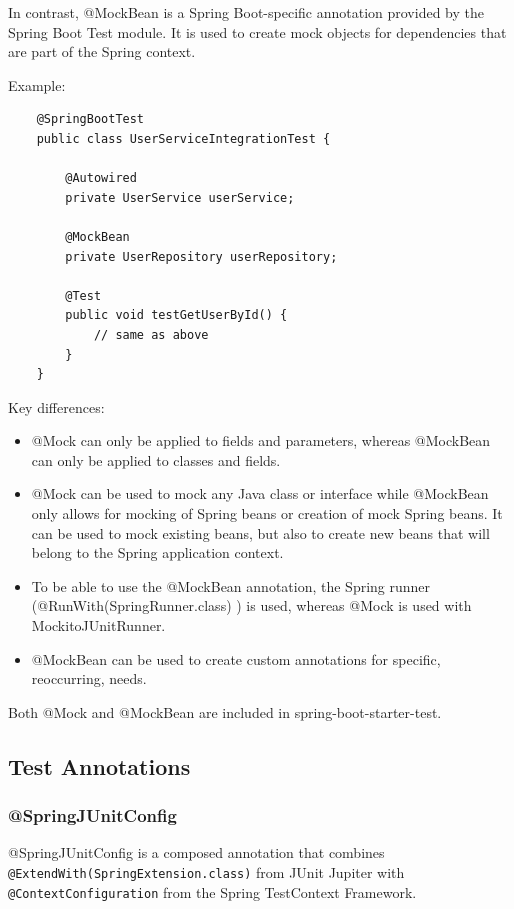 \documentclass{scrartcl}
\begin{document}
In contrast, @MockBean is a Spring Boot-specific annotation provided by the Spring Boot Test module. It is used to create mock objects for dependencies that are part of the Spring context.

Example:

\begin{lstlisting}
    @SpringBootTest
    public class UserServiceIntegrationTest {

        @Autowired
        private UserService userService;

        @MockBean
        private UserRepository userRepository;

        @Test
        public void testGetUserById() {
            // same as above
        }
    }
\end{lstlisting}


Key differences:

\begin{itemize}
    \item @Mock can only be applied to fields and parameters, whereas @MockBean can only be applied to classes and fields.
    \item @Mock can be used to mock any Java class or interface while @MockBean only allows for mocking of Spring beans or creation of mock Spring beans. It can be used to mock existing beans, but also to create new beans that will belong to the Spring application context.
    \item To be able to use the @MockBean annotation, the Spring runner (@RunWith(SpringRunner.class) ) is used, whereas @Mock is used with MockitoJUnitRunner.
    \item @MockBean can be used to create custom annotations for specific, reoccurring, needs.
\end{itemize}

Both @Mock and @MockBean are included in spring-boot-starter-test.

\subsection{Test Annotations}

\subsubsection{@SpringJUnitConfig}

@SpringJUnitConfig is a composed annotation that combines \lstinline|@ExtendWith(SpringExtension.class)| from JUnit Jupiter with \lstinline|@ContextConfiguration| from the Spring TestContext Framework.
\end{document}
